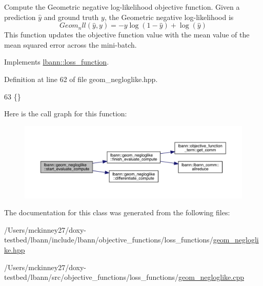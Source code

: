 Compute the Geometric negative log-\/likelihood objective function. Given a prediction $\hat{y}$ and ground truth $y$, the Geometric negative log-\/likelihood is \[ Geom_nll(\hat{y},y) = -y \log(1-\hat{y}) + \log(\hat{y}) \] This function updates the objective function value with the mean value of the mean squared error across the mini-\/batch. 

Implements \hyperlink{classlbann_1_1loss__function_a0bbe41060d788dc7a29f3737761a6f7d}{lbann\+::loss\+\_\+function}.



Definition at line 62 of file geom\+\_\+negloglike.\+hpp.


\begin{DoxyCode}
63                                                                        \{\}
\end{DoxyCode}
Here is the call graph for this function\+:\nopagebreak
\begin{figure}[H]
\begin{center}
\leavevmode
\includegraphics[width=350pt]{classlbann_1_1geom__negloglike_ae17106630ad2f85df0dbd528bfbbea7d_cgraph}
\end{center}
\end{figure}


The documentation for this class was generated from the following files\+:\begin{DoxyCompactItemize}
\item 
/\+Users/mckinney27/doxy-\/testbed/lbann/include/lbann/objective\+\_\+functions/loss\+\_\+functions/\hyperlink{geom__negloglike_8hpp}{geom\+\_\+negloglike.\+hpp}\item 
/\+Users/mckinney27/doxy-\/testbed/lbann/src/objective\+\_\+functions/loss\+\_\+functions/\hyperlink{geom__negloglike_8cpp}{geom\+\_\+negloglike.\+cpp}\end{DoxyCompactItemize}
